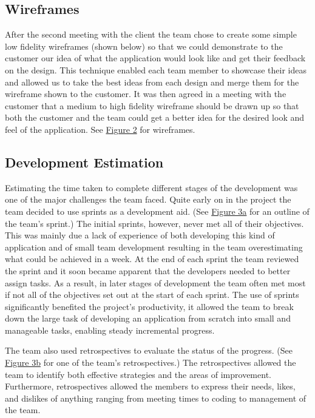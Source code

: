 \documentclass{l3proj}
\begin{document}
\subsection{Wireframes}
After the second meeting with the client the team chose to create some simple low fidelity wireframes (shown below) so that we could demonstrate to the customer our idea of what the application would look like and get their feedback on the design. This technique enabled each team member to showcase their ideas and allowed us to take the best ideas from each design and merge them for the wireframe shown to the customer. It was then agreed in a meeting with the customer that a medium to high fidelity wireframe should be drawn up so that both the customer and the team could get a better idea for the desired look and feel of the application. See \hyperref[fig:wireframes]{Figure 2} for wireframes.




\subsection{Development Estimation}
Estimating the time taken to complete different stages of the development was one of the major challenges the team faced. Quite early on in the project the team decided to use sprints as a development aid. (See \hyperref[fig:estimation]{Figure 3a} for an outline of the team's sprint.) The initial sprints, however, never met all of their objectives. This was mainly due a lack of experience of both developing this kind of application and of small team development resulting in the team overestimating what could be achieved in a week. At the end of each sprint the team reviewed the sprint and it soon became apparent that the developers needed to better assign tasks. As a result, in later stages of development the team often met most if not all of the objectives set out at the start of each sprint. The use of sprints significantly benefited the project's productivity, it allowed the team to break down the large task of developing an application from scratch into small and manageable tasks, enabling steady incremental progress.

The team also used retrospectives to evaluate the status of the progress. (See \hyperref[fig:estimation]{Figure 3b} for one of the team's retrospectives.) The retrospectives allowed the team to identify both effective strategies and the areas of improvement. Furthermore, retrospectives allowed the members to express their needs, likes, and dislikes of anything ranging from meeting times to coding to management of the team.
\end{document}

